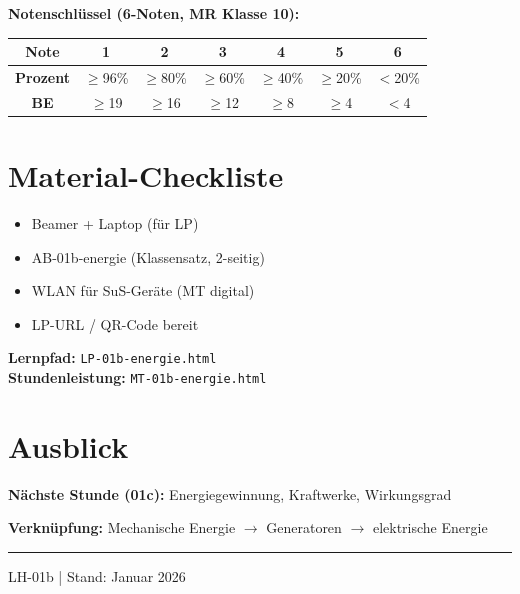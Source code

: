 \documentclass[11pt, a4paper]{article}
\begin{document}
\vspace{0.5em}
\textbf{Notenschlüssel (6-Noten, MR Klasse 10):}

\begin{tabularx}{\textwidth}{@{}c|c|c|c|c|c|c@{}}
\toprule
\textbf{Note} & 1 & 2 & 3 & 4 & 5 & 6 \\
\midrule
\textbf{Prozent} & $\geq$96\% & $\geq$80\% & $\geq$60\% & $\geq$40\% & $\geq$20\% & $<$20\% \\
\midrule
\textbf{BE} & $\geq$19 & $\geq$16 & $\geq$12 & $\geq$8 & $\geq$4 & $<$4 \\
\bottomrule
\end{tabularx}


\section*{Material-Checkliste}

\begin{itemize}[leftmargin=2em]
    \item[$\square$] Beamer + Laptop (für LP)
    \item[$\square$] AB-01b-energie (Klassensatz, 2-seitig)
    \item[$\square$] WLAN für SuS-Geräte (MT digital)
    \item[$\square$] LP-URL / QR-Code bereit
\end{itemize}

\begin{infobox}[URLs]
\textbf{Lernpfad:} \texttt{LP-01b-energie.html}\\
\textbf{Stundenleistung:} \texttt{MT-01b-energie.html}
\end{infobox}


\section*{Ausblick}

\textbf{Nächste Stunde (01c):} Energiegewinnung, Kraftwerke, Wirkungsgrad

\textbf{Verknüpfung:} Mechanische Energie $\rightarrow$ Generatoren $\rightarrow$ elektrische Energie

\vfill
\hrule
\vspace{0.3em}
\begin{center}
\small\textcolor{mittelgrau}{LH-01b | Stand: Januar 2026}
\end{center}
\end{document}
